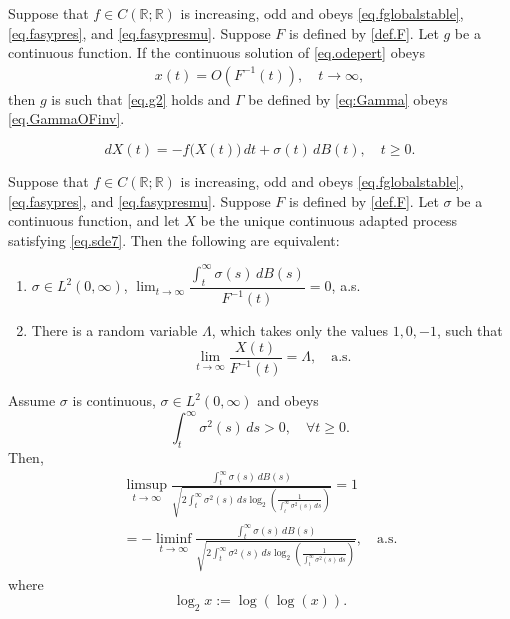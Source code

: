 \documentclass[10pt,a4paper]{amsart}
\begin{document}
	\begin{theorem} \label{thm.bigOconverse}
		Suppose that $f\in C(\mathbb{R};\mathbb{R})$ is increasing, odd and obeys \eqref{eq.fglobalstable}, \eqref{eq.fasypres}, and \eqref{eq.fasypresmu}. Suppose $F$ is defined by \eqref{def.F}.  Let $g$ be a continuous function. If the continuous solution of \eqref{eq.odepert}  obeys 
		\begin{align*}
			x(t)=O(F^{-1}(t)), \quad t\to\infty,
		\end{align*}	
		then $g$ is such that \eqref{eq.g2} holds and $\Gamma$ be defined by \eqref{eq:Gamma} obeys \eqref{eq.GammaOFinv}.  
	\end{theorem}	

	\begin{equation}  \label{eq.sde7}
		dX(t) = -f\big(X(t)\big)\,dt + \sigma(t)\,dB(t), \quad t\geq 0.
	\end{equation}

	\begin{theorem} \label{thm.Xwithtailmart}
		Suppose that $f\in C(\mathbb{R};\mathbb{R})$ is increasing, odd and obeys \eqref{eq.fglobalstable}, \eqref{eq.fasypres}, and \eqref{eq.fasypresmu}. Suppose $F$ is defined by \eqref{def.F}.  Let $\sigma$ be a continuous function, and let $X$ be the unique continuous adapted process satisfying \eqref{eq.sde7}.
		Then the following are equivalent:
		\begin{enumerate}
			\item[(A)] $\sigma \in L^2(0,\infty)$, \quad $\lim_{t \to \infty} \dfrac{\int_{t}^{\infty} \sigma(s)\, dB(s)}{F^{-1}(t)} = 0$, \; a.s.
			\item[(B)] There is a random variable $\Lambda$, which takes only the values $1,0,-1$, such that
			\[
			\lim_{t \to \infty} \frac{X(t)}{F^{-1}(t)} = \Lambda, \quad \text{a.s.}
			\]
		\end{enumerate}
	\end{theorem}

	\begin{lemma} \label{lemma.tailmartasy} Assume $\sigma$ is continuous, $\sigma \in L^2(0, \infty)$ and obeys
		\begin{equation} \label{d}
			\int_t^\infty \sigma^2(s) \, ds > 0, \quad \forall t \geq 0.
		\end{equation}
		Then,
		\begin{multline*}
			\limsup_{t \to \infty} \frac{\int_t^\infty \sigma(s) \, dB(s)}{\sqrt{2 \int_t^\infty \sigma^2(s) \, ds \log_2 \left( \frac{1}{\int_t^\infty \sigma^2(s) \, ds} \right)}} = 1\\
			= -\liminf_{t \to \infty} \frac{ \int_t^\infty \sigma(s) \, dB(s)}{\sqrt{2 \int_t^\infty \sigma^2(s) \, ds \log_2 \left( \frac{1}{\int_t^\infty \sigma^2(s) \, ds} \right)}}, \quad \text{a.s.}
		\end{multline*}
		where
		\[
		\log_2 x := \log(\log(x)).
		\]
	\end{lemma}
\end{document}
